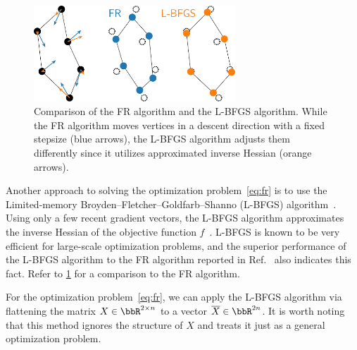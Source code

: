 \documentclass[dvipdfmx,10pt,journal,compsoc]{IEEEtran}
\begin{document}
\begin{figure}[t]
  \centering
  \includegraphics[height=3.59cm]{comparison/comparison_FRandLBFGS.pdf}
  \caption{
    Comparison of the FR algorithm and the L-BFGS algorithm.
    While the FR algorithm moves vertices in a descent direction with a fixed stepsize (blue arrows), the L-BFGS algorithm adjusts them differently since it utilizes approximated inverse Hessian (orange arrows).
  }
  \label{fig:comparisonFRandLBFGS}
\end{figure}

Another approach to solving the optimization problem~\eqref{eq:fr} is to use the Limited-memory Broyden--Fletcher--Goldfarb--Shanno (L-BFGS) algorithm~\cite{6183577}.
Using only a few recent gradient vectors, the L-BFGS algorithm approximates the inverse Hessian of the objective function $f$~\cite{liuLimitedMemoryBFGS1989}.
L-BFGS is known to be very efficient for large-scale optimization problems, and the superior performance of the L-BFGS algorithm to the FR algorithm reported in Ref.~\cite{6183577} also indicates this fact. Refer to \cref{fig:comparisonFRandLBFGS} for a comparison to the FR algorithm.

For the optimization problem~\eqref{eq:fr}, we can apply the L-BFGS algorithm via flattening the matrix $X \in \bbR^{2 \times n}$ to a vector $\overline{X} \in \bbR^{2n}$.
It is worth noting that this method ignores the structure of $X$ and treats it just as a general optimization problem.

\end{document}

